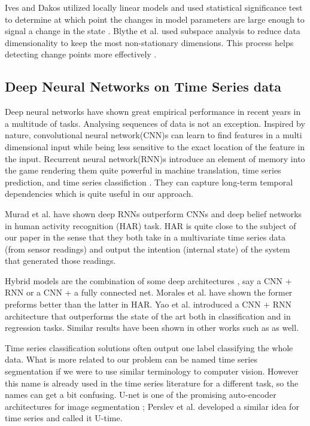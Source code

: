 Ives and Dakos utilized locally linear models and used statistical significance test to determine at which point the changes in model parameters are large enough to signal a change in the state \cite{Ives2012}. Blythe et al. used subspace analysis to reduce data dimensionality to keep the most non-stationary dimensions. This process helps detecting change points more effectively \cite{Blythe2012}. 



\subsection{Deep Neural Networks on Time Series data}
Deep neural networks have shown great empirical performance in recent years in a multitude of tasks. 
Analysing sequences of data is not an exception. Inspired by nature, convolutional neural network(CNN)s can learn to find features in a multi dimensional input while being less sensitive to the exact location of the feature in the input. \cite{lecun2015deep} Recurrent neural network(RNN)s introduce an element of memory into the game rendering them quite powerful in machine translation, time series prediction, and time series classifiction  \cite{cho2014learning, zhang2000predicting, wang2017time, murad2017deep, yang2015deep, Ordonez2016}. They can capture long-term temporal dependencies which is quite useful in our approach. \cite{Che2018}

Murad et al. \cite{murad2017deep} have shown deep RNNs outperform CNNs and deep belief networks in human activity recognition (HAR) task. HAR is quite close to the subject of our paper in the sense that they both take in a multivariate time series data (from sensor readings) and output the intention (internal state) of the system that generated those readings. 


Hybrid models are the combination of some deep architectures \cite{wang2019deep}, say a CNN + RNN or a CNN + a fully connected net. Morales et al. have shown the former preforms better than the latter in HAR\cite{morales2016deep}. Yao et al. \cite{deepsense} introduced a CNN + RNN architecture that outperforms the state of the art both in  classification and in regression tasks. Similar results have been shown in other works such as \cite{Ordonez2016, singh2017transforming, zheng2016exploiting} as well.


Time series classification solutions often output one label classifying the whole data. What is more related to our problem can be named time series segmentation if we were to use similar terminology to computer vision. However this name is already used in the time series literature for a different task, so the names can get a bit confusing. U-net is one of the promising auto-encoder architectures for image segmentation \cite{ronneberger2015u}; Perslev et al. developed a similar idea for time series and called it U-time. \cite{perslev2019u}